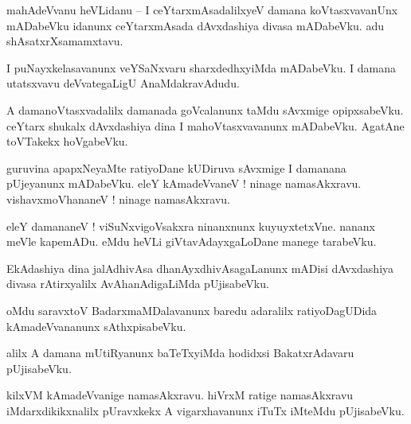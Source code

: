 \documentclass{article}
\begin{document}

\begin{mn}%
mahAdeVvanu heVLidanu -- I ceYtarxmAsadalilxyeV damana koVtasxvavanUnx mADabeVku idanunx 
ceYtarxmAsada dAvxdashiya divasa mADabeVku. adu shAsatxrXsamamxtavu.
\end{mn}

\begin{mn}%
I puNayxkelasavanunx veYSaNxvaru sharxdedhxyiMda mADabeVku. I damana utatsxvavu deVvategaLigU 
AnaMdakravAdudu.
\end{mn}

\begin{mn}%
A damanoVtasxvadalilx damanada goVcalanunx taMdu sAvxmige opipxsabeVku. ceYtarx shukalx dAvxdashiya 
dina I mahoVtasxvavanunx mADabeVku. AgatAne toVTakekx hoVgabeVku.
\end{mn}

\begin{mn}%
guruvina apapxNeyaMte ratiyoDane kUDiruva sAvxmige I damanana pUjeyanunx mADabeVku. eleY 
kAmadeVvaneV ! ninage namasAkxravu. vishavxmoVhananeV ! ninage namasAkxravu.
\end{mn}

\begin{mn}%
eleY damananeV ! viSuNxvigoVsakxra ninanxnunx kuyuyxtetxVne. nananx meVle kapemADu. eMdu heVLi 
giVtavAdayxgaLoDane manege tarabeVku.
\end{mn}

\begin{mn}%
EkAdashiya dina jalAdhivAsa dhanAyxdhivAsagaLanunx mADisi dAvxdashiya divasa rAtirxyalilx 
AvAhanAdigaLiMda pUjisabeVku.
\end{mn}

\begin{mn}%
oMdu saravxtoV BadarxmaMDalavanunx baredu adaralilx ratiyoDagUDida kAmadeVvananunx sAthxpisabeVku.
\end{mn}

\begin{mn}%
alilx A damana mUtiRyanunx baTeTxyiMda hodidxsi BakatxrAdavaru pUjisabeVku.
\end{mn}

\begin{mn}%
kilxVM kAmadeVvanige namasAkxravu. hiVrxM ratige namasAkxravu iMdarxdikikxnalilx pUravxkekx A 
vigarxhavanunx iTuTx iMteMdu pUjisabeVku.
\end{mn}
\end{document}
